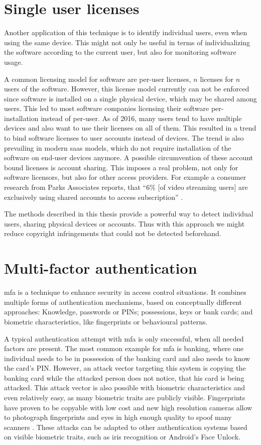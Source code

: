 \section{Single user licenses}
Another application of this technique is to identify individual users, even when using the same device. This might not only be useful in terms of individualizing the software according to the current user, but also for monitoring software usage.

A common licensing model for software are per-user licenses, \ie $n$ licenses for $n$ users of the software. However, this license model currently can not be enforced since software is installed on a single physical device, which may be shared among users. This led to most software companies licensing their software per-installation instead of per-user.
As of 2016, many users tend to have multiple devices and also want to use their licenses on all of them. This resulted in a trend to bind software licenses to user accounts instead of devices. The trend is also prevailing in modern \gls{saas} models, which do not require installation of the software on end-user devices anymore.
A possible circumvention of these account bound licenses is account sharing. This imposes a real problem, not only for software licensors, but also for other access providers. For example a consumer research from Parks Associates reports, that ``6\% [of video streaming users] are exclusively using shared accounts to access subscription'' \cite{accountsharing}. 

The methods described in this thesis provide a powerful way to detect individual users, sharing physical devices or accounts. Thus with this approach we might reduce copyright infringements that could not be detected beforehand.

\section{Multi-factor authentication}
\gls{mfa} is a technique to enhance security in access control situations. It combines multiple forms of authentication mechanisms, based on conceptually different approaches: Knowledge, \eg passwords or PINs; possessions, \eg keys or bank cards; and biometric characteristics, like fingerprints or behavioural patterns.

A typical authentication attempt with \gls{mfa} is only successful, when all needed factors are present. The most common example for \gls{mfa} is banking, where one individual needs to be in possession of the banking card and also needs to know the card's PIN. However, an attack vector targeting this system is copying the banking card while the attacked person does not notice, that his card is being attacked. This attack vector is also possible with biometric characteristics and even relatively easy, as many biometric traits are publicly visible. Fingerprints have proven to be copyable with low cost \cite{starbug2008bastel} and new high resolution cameras allow to photograph fingerprints and eyes in high enough quality to spoof many scanners \cite{fiebig2014security}. These attacks can be adapted to other authentication systems based on visible biometric traits, such as iris recognition or Android's Face Unlock.

